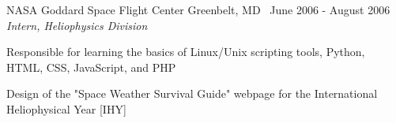 \leftandright
  {NASA Goddard Space Flight Center}
  {Greenbelt, MD \textbullet\, June 2006 - August 2006}\\  
\vspace{-0.8em}
\textit{Intern,  Heliophysics Division}
\begin{itemize*}
  \item Responsible for learning the basics of Linux/Unix scripting
    tools, Python, HTML, CSS, JavaScript, and PHP
  \item Design of the "Space Weather Survival Guide" webpage
    for the International Heliophysical Year [IHY]
\end{itemize*}

